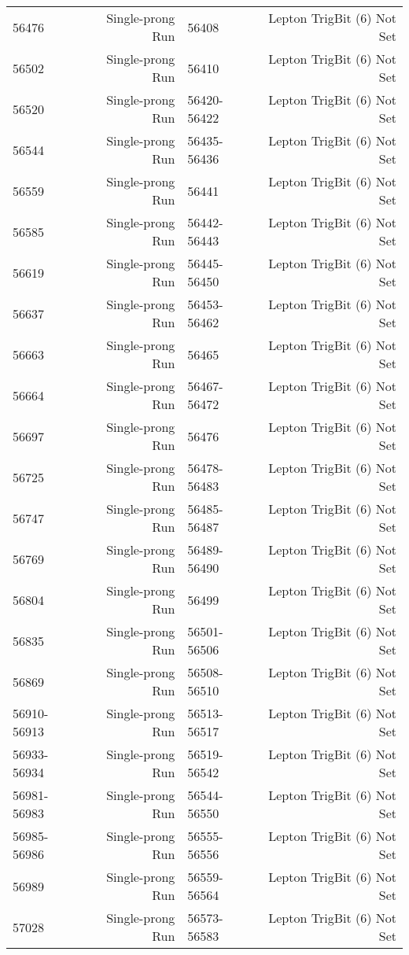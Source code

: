 \begin{center}
\begin{singlespacing}
\begin{longtable}{lr||lr}
56476	&	 Single-prong Run 		&	56408	&	  Lepton TrigBit (6) Not Set 	\\
56502	&	 Single-prong Run 		&	56410	&	  Lepton TrigBit (6) Not Set 	\\
56520	&	 Single-prong Run 		&	56420-56422 	&	  Lepton TrigBit (6) Not Set 	\\
56544	&	 Single-prong Run 		&	56435-56436 	&	  Lepton TrigBit (6) Not Set 	\\
56559	&	 Single-prong Run 		&	56441	&	  Lepton TrigBit (6) Not Set 	\\
56585	&	 Single-prong Run 		&	56442-56443 	&	  Lepton TrigBit (6) Not Set 	\\
56619	&	 Single-prong Run 		&	56445-56450 	&	  Lepton TrigBit (6) Not Set 	\\
56637	&	 Single-prong Run 		&	56453-56462 	&	  Lepton TrigBit (6) Not Set 	\\
56663	&	 Single-prong Run 		&	56465	&	  Lepton TrigBit (6) Not Set 	\\
56664	&	 Single-prong Run 		&	56467-56472 	&	  Lepton TrigBit (6) Not Set 	\\
56697	&	 Single-prong Run 		&	56476	&	  Lepton TrigBit (6) Not Set 	\\
56725	&	 Single-prong Run 		&	56478-56483 	&	  Lepton TrigBit (6) Not Set 	\\
56747	&	 Single-prong Run 		&	56485-56487 	&	  Lepton TrigBit (6) Not Set 	\\
56769	&	 Single-prong Run 		&	56489-56490 	&	  Lepton TrigBit (6) Not Set 	\\
56804	&	 Single-prong Run 		&	56499	&	  Lepton TrigBit (6) Not Set 	\\
56835	&	 Single-prong Run 		&	56501-56506 	&	  Lepton TrigBit (6) Not Set 	\\
56869	&	 Single-prong Run 		&	56508-56510 	&	  Lepton TrigBit (6) Not Set 	\\
56910-56913 	&	 Single-prong Run 		&	56513-56517 	&	  Lepton TrigBit (6) Not Set 	\\
56933-56934 	&	 Single-prong Run 		&	56519-56542 	&	  Lepton TrigBit (6) Not Set 	\\
56981-56983 	&	 Single-prong Run 		&	56544-56550 	&	  Lepton TrigBit (6) Not Set 	\\
56985-56986 	&	 Single-prong Run 		&	56555-56556 	&	  Lepton TrigBit (6) Not Set 	\\
56989	&	 Single-prong Run 		&	56559-56564 	&	  Lepton TrigBit (6) Not Set 	\\
57028	&	 Single-prong Run 		&	56573-56583 	&	  Lepton TrigBit (6) Not Set 	\\

\end{longtable}
\end{singlespacing}
\end{center}
